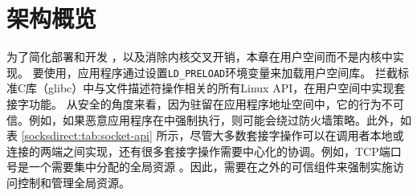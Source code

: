 \section{架构概览}
\label{socksdirect:sec:architecture}





为了简化部署和开发 \cite {andromeda}，以及消除内核交叉开销，本章在用户空间而不是内核中实现\sys{}。
要使用\sys{}，应用程序通过设置\texttt {LD\_PRELOAD}环境变量来加载用户空间库\libipc {}。 \libipc {} 拦截标准C库（glibc）中与文件描述符操作相关的所有Linux API，在用户空间中实现套接字功能。
从安全的角度来看，因为\libipc {}驻留在应用程序地址空间中，它的行为不可信。例如，如果恶意应用程序在\libipc {}中强制执行，则可能会绕过防火墙策略。此外，如表 \ref{socksdirect:tab:socket-api} 所示，尽管大多数套接字操作可以在调用者本地或连接的两端之间实现，还有很多套接字操作需要中心化的协调。例如，TCP端口号是一个需要集中分配的全局资源 \cite {lin2016scalable,nsdi19freeflow}。因此，需要在\libipc {}之外的可信组件来强制实施访问控制和管理全局资源。

